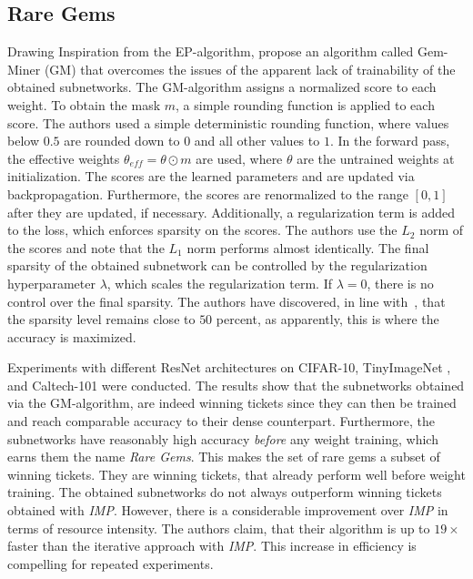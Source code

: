 \subsection{Rare Gems}
Drawing Inspiration from the EP-algorithm, \textcite{RareGems} propose an algorithm called Gem-Miner (GM) that overcomes the issues of the apparent lack of trainability of the obtained subnetworks.
The {GM}-algorithm assigns a normalized score to each weight. 
To obtain the mask $m$, a simple rounding function is applied to each score. The authors used a simple deterministic rounding function, where values below $0.5$ are rounded down to $0$ and all other values to $1$.
In the forward pass, the effective weights $\theta_{eff} = \theta \odot m$ are used, where $\theta$ are the untrained weights at initialization. 
The scores are the learned parameters and are updated via backpropagation.
Furthermore, the scores are renormalized to the range $[0,1]$ after they are updated, if necessary.
Additionally, a regularization term is added to the loss, which enforces sparsity on the scores. 
The authors use the $L_2$ norm of the scores and note that the $L_1$ norm performs almost identically.
The final sparsity of the obtained subnetwork can be controlled by the regularization hyperparameter $\lambda$, which scales the regularization term.
If $\lambda = 0$, there is no control over the final sparsity. 
The authors have discovered, in line with~\cite{EdgePopup}, that the sparsity level remains close to $50$ percent, as apparently, this is where the accuracy is maximized.

Experiments with different ResNet architectures on CIFAR-10, TinyImageNet \autocite{Tinyimagenet}, and Caltech-101 \autocite{Caltech101} were conducted. 
The results show that the subnetworks obtained via the {GM}-algorithm, are indeed winning tickets since they can then be trained and reach comparable accuracy to their dense counterpart.
Furthermore, the subnetworks have reasonably high accuracy \textit{before} any weight training, which earns them the name \textit{Rare Gems}. 
This makes the set of rare gems a subset of winning tickets. 
They are winning tickets, that already perform well before weight training.
The obtained subnetworks do not always outperform winning tickets obtained with \textit{IMP}. 
However, there is a considerable improvement over \textit{IMP} in terms of resource intensity.
The authors claim, that their algorithm is up to $19\times$ faster than the iterative approach with \textit{IMP}. 
This increase in efficiency is compelling for repeated experiments.

